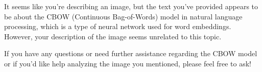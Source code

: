 It seems like you're describing an image, but the text you've provided appears to be about the CBOW (Continuous Bag-of-Words) model in natural language processing, which is a type of neural network used for word embeddings. However, your description of the image seems unrelated to this topic.

If you have any questions or need further assistance regarding the CBOW model or if you'd like help analyzing the image you mentioned, please feel free to ask!